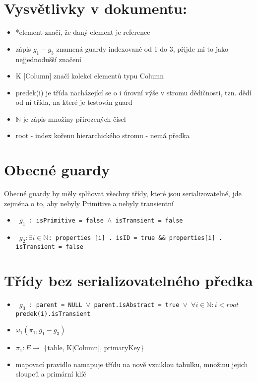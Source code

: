 \documentclass[11pt,a4paper]{article}   	%
\begin{document}

	\section{ Vysvětlivky v dokumentu: }
		\begin{itemize} 
  			\item *element značí, že daný element je reference
  			\item zápis \begin{math}g_1 - g_3\end{math} znamená guardy indexované od 1 do 3, přijde mi to jako nejjednodušší značení 				
  			\item K [Column] značí kolekci elementů typu Column	
  			\item predek(i) je třída nacházející se o i úrovní výše v stromu dědičnosti, tzn.
				dědí od ní třída, na které je testován guard
			\item $\mathbb{N}$ je zápis množiny přirozených čísel
			\item root - index kořenu hierarchického stromu - nemá předka  
		\end{itemize}		

	\section{Obecné guardy}
		Obecné guardy by měly splňovat všechny třídy, které jsou serializovatelné, jde
		zejména o to, aby nebyly Primitive a nebyly transientní
		\begin{itemize}
			\item 	\texttt	{
						$g_1$ : isPrimitive = false $\wedge$ isTransient = false  
					}
			\item 	\texttt {
						$g_2 : \exists i \in \mathbb{N} $: properties [i] . isID =
						true \&\& properties[i] . isTransient = false
					}
		\end{itemize}
		
 	\section{Třídy bez serializovatelného předka}
 		\begin{itemize}
 			\item 	\texttt {
 						$g_3$ : parent = NULL $\vee$ parent.isAbstract = true $\vee$
 						$\forall i \in \mathbb{N}: i < root $ predek(i).isTransient 
 					}
 		 	\item	$\omega_1 (\pi_1, g_1 - g_3)$
 		 	\item 	$\pi_1 : E \to $ \{table,  K[Column], primaryKey\}
 		 	\item 	mapovací pravidlo namapuje třídu na nově vzniklou tabulku,
 		 			množinu jejich sloupců a primární klíč
 		\end{itemize}
\end{document}
